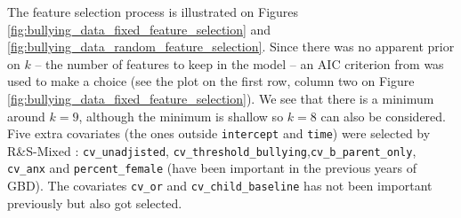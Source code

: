 \documentclass[11pt,letterpaper]{article}
\newcommand{\ouralgo}{R\&S-Mixed }
\numberwithin{equation}{section} %
\numberwithin{figure}{section} %
\numberwithin{table}{section} %
\begin{document}
The feature selection process is illustrated on Figures \ref{fig:bullying_data_fixed_feature_selection} and \ref{fig:bullying_data_random_feature_selection}. Since there was no apparent prior on $k$ -- the number of features to keep in the model -- an AIC criterion from \cite{Vaida2005} was used to make a choice (see the plot on the first row, column two on Figure \ref{fig:bullying_data_fixed_feature_selection}). We see that there is a minimum around $k=9$, although the minimum is shallow so $k=8$ can also be considered. Five extra covariates (the ones outside \texttt{intercept} and \texttt{time}) were selected by \ouralgo: \texttt{cv\_unadjisted}, \texttt{cv\_threshold\_bullying},\texttt{cv\_b\_parent\_only}, \texttt{cv\_anx} and \texttt{percent\_female} (have been important in the previous years of GBD). The covariates \texttt{cv\_or} and \texttt{cv\_child\_baseline} has not been important previously but also got selected.
\end{document}
